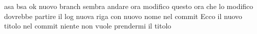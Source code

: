 \documentclass{article}
\begin{document}
asa
bsa
ok nuovo branch
sembra andare
ora modifico questo
ora che lo modifico dovrebbe partire il log
nuova riga con nuovo nome nel commit
Ecco il nuovo titolo nel commit
niente non vuole prendermi il titolo
\end{document}
